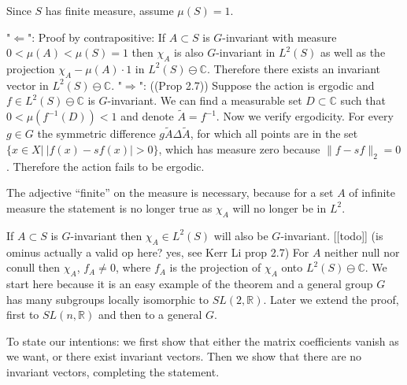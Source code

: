 \documentclass[
]{article}
\begin{document}
Since \(S\) has finite measure, assume \(\mu(S) =1\).

\begin{pf}
"$\Leftarrow$": Proof by contrapositive: If $A\subset S$ is $G$-invariant with measure $0 < \mu(A) < \mu(S) = 1$ then $\chi_A$ is also $G$-invariant in $L^2(S)$ as well as the projection $\chi_A - \mu(A)\cdot 1$ in $L^2(S)\ominus \mathbb{C}$.
Therefore there exists an invariant vector in $L^2(S)\ominus \mathbb{C}$.
"$\Rightarrow$": (\cite{Kerr16}(Prop 2.7)) Suppose the action is ergodic and $f\in L^2(S)\ominus \mathbb{C}$ is $G$-invariant.
We can find a measurable set $D\subset \mathbb{C}$ such that $0<\mu(f^{-1}(D)) < 1$ and denote $\widetilde{A} = f^{-1}$. Now we verify ergodicity. For every $g\in G$ the symmetric difference $g\widetilde{A} \Delta \widetilde{A}$, for which all points are in the set $\{x \in X | \ |f(x)-sf(x)| > 0\}$, which has measure zero because $\|f- sf\|_2=0$. Therefore the action fails to be ergodic.
\end{pf}

The adjective ``finite'' on the measure is necessary, because for a set
\(A\) of infinite measure the statement is no longer true as \(\chi_A\)
will no longer be in \(L^2\).

If \(A\subset S\) is \(G\)-invariant then \(\chi_A\in L^2(S)\) will also
be \(G\)-invariant. {[}{[}todo{]}{]} (is ominus actually a valid op
here? yes, see Kerr Li prop 2.7) For \(A\) neither null nor conull then
\(\chi_A\), \(f_A \neq 0\), where \(f_A\) is the projection of
\(\chi_A\) onto \(L^2(S) \ominus \mathbb{C}\).
We start here because it is an easy example of the theorem and a general
group \(G\) has many subgroups locally isomorphic to
\(SL(2, \mathbb{R})\). Later we extend the proof, first to
\(SL(n, \mathbb{R})\) and then to a general \(G\).

To state our intentions: we first show that either the matrix
coefficients vanish as we want, or there exist invariant vectors. Then
we show that there are no invariant vectors, completing the statement.
\end{document}
